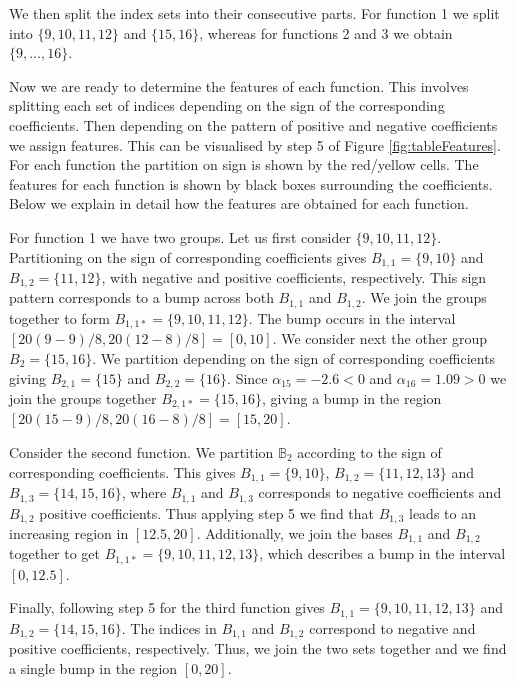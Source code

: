 \documentclass[12pt]{book} %
\begin{document}
  We then split the index sets into their consecutive parts. For function 1 we split into $\{9, 10, 11, 12\}$ and $\{15, 16\}$, whereas for functions 2 and 3 we obtain $\{9, \dots, 16\}$.
  
  Now we are ready to determine the features of each function. This involves splitting each set of indices depending on the sign of the corresponding coefficients. Then depending on the pattern of positive and negative coefficients we assign features.  This can be visualised by step 5 of Figure \ref{fig:tableFeatures}. For each function the partition on sign is shown by the red/yellow cells. The features for each function is shown by black boxes surrounding the coefficients. Below we explain in detail how the features are obtained for each function.
     
  For function 1 we have two groups. Let us first consider $\{9,10,11,12\}$. Partitioning on the sign of corresponding coefficients gives $B_{1,1} =\{9,10\}$ and $B_{1,2}=\{11,12\}$, with negative and positive coefficients, respectively. This sign pattern corresponds to a bump across both  $B_{1,1}$ and  $B_{1,2}$. We join the groups together to form $B_{1,1*} = \{9,10,11,12\}$. The bump occurs in the interval $[20(9-9)/8 , 20(12-8)/8] = [0,10]$. We consider next the other group $B_{2} = \{15,16\}$. We partition depending on the sign of corresponding coefficients giving $B_{2,1} = \{15\}$ and $B_{2,2} = \{16\}$. Since $\alpha_{15} = -2.6 < 0$ and $\alpha_{16} = 1.09 > 0$  we join the  groups together $B_{2,1*} = \{15,16\}$, giving a bump in the region $[20(15-9)/8 , 20(16-8)/8] = [15,20]$.
  
  Consider the second function. We partition $\mathbb{B}_2$ according to the sign of corresponding coefficients. This gives $B_{1,1} = \{9,10\}$, $B_{1,2} = \{11,12,13\}$ and $B_{1,3} = \{14,15,16\}$, where $B_{1,1}$ and $B_{1,3}$ corresponds to negative coefficients and $B_{1,2}$ positive coefficients. Thus applying step 5 we find that $B_{1,3}$ leads to an increasing region in $[12.5,20]$. Additionally, we join the bases $B_{1,1}$ and $B_{1,2}$ together to get $B_{1,1*} = \{9,10,11,12,13\}$, which describes a bump in the interval $[0,12.5]$. 
   
  Finally, following step 5 for the third function gives $B_{1,1} =  \{9,10,11,12,13\}$ and $B_{1,2} = \{14,15,16\}$. The indices in $B_{1,1}$ and $B_{1,2}$ correspond to negative and positive coefficients, respectively. Thus, we join the two sets together and we find a single bump in the region $[0,20]$.
  
\end{document}
